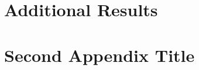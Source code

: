 
\renewcommand{\theHchapter}{A\arabic{chapter}}
\appendix

\chapter{Additional Results}
\label{app:addResults}


\chapter{Second Appendix Title}
%
